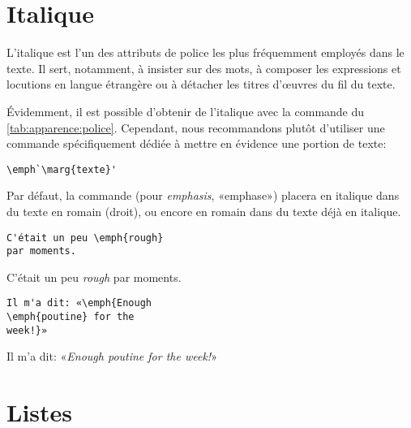 \section{Italique}

L'italique est l'un des attributs de police les plus fréquemment
employés dans le texte. Il sert, notamment, à insister sur des mots, à
composer les expressions et locutions en langue étrangère ou à
détacher les titres d'{\oe}uvres du fil du texte.

Évidemment, il est possible d'obtenir de l'italique avec la commande
\cmd{\textit} du \autoref{tab:apparence:police}. Cependant, nous
recommandons plutôt d'utiliser une commande spécifiquement dédiée à
mettre en évidence une portion de texte:
\begin{lstlisting}
\emph`\marg{texte}'
\end{lstlisting}
Par défaut, la commande \cmd{\emph} (pour \emph{emphasis}, «emphase»)
placera  en italique dans du texte en romain (droit), ou
encore en romain dans du texte déjà en italique.
\begin{demo}
  \begin{texample}
\begin{lstlisting}
C'était un peu \emph{rough}
par moments.
\end{lstlisting}
    \producing
    C'était un peu \emph{rough} par moments.
  \end{texample}
  \begin{texample}
\begin{lstlisting}
Il m'a dit: «\emph{Enough
\emph{poutine} for the
week!}»
\end{lstlisting}
    \producing
    Il m'a dit: «\emph{Enough \emph{poutine} for the week!}»
  \end{texample}
\end{demo}



\section{Listes}
\label{sec:apparence:listes}

